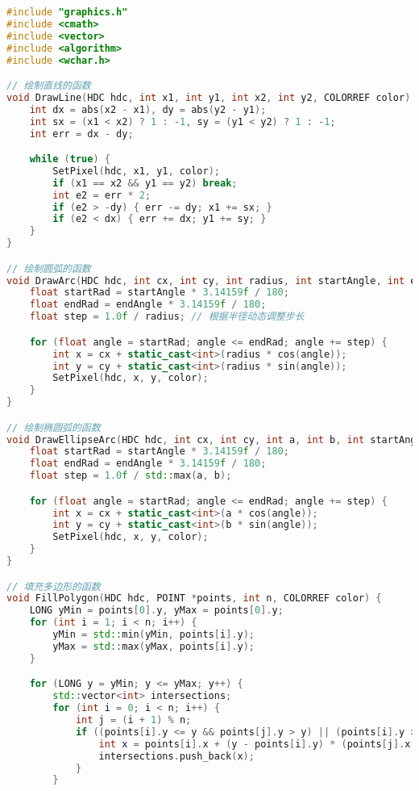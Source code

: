\documentclass[11pt,a4paper]{article}
\begin{document}
\begin{lstlisting}[language=C++]
#include "graphics.h"
#include <cmath>
#include <vector>
#include <algorithm>
#include <wchar.h>

// 绘制直线的函数
void DrawLine(HDC hdc, int x1, int y1, int x2, int y2, COLORREF color) {
    int dx = abs(x2 - x1), dy = abs(y2 - y1);
    int sx = (x1 < x2) ? 1 : -1, sy = (y1 < y2) ? 1 : -1;
    int err = dx - dy;

    while (true) {
        SetPixel(hdc, x1, y1, color);
        if (x1 == x2 && y1 == y2) break;
        int e2 = err * 2;
        if (e2 > -dy) { err -= dy; x1 += sx; }
        if (e2 < dx) { err += dx; y1 += sy; }
    }
}

// 绘制圆弧的函数
void DrawArc(HDC hdc, int cx, int cy, int radius, int startAngle, int endAngle, COLORREF color) {
    float startRad = startAngle * 3.14159f / 180;
    float endRad = endAngle * 3.14159f / 180;
    float step = 1.0f / radius; // 根据半径动态调整步长

    for (float angle = startRad; angle <= endRad; angle += step) {
        int x = cx + static_cast<int>(radius * cos(angle));
        int y = cy + static_cast<int>(radius * sin(angle));
        SetPixel(hdc, x, y, color);
    }
}

// 绘制椭圆弧的函数
void DrawEllipseArc(HDC hdc, int cx, int cy, int a, int b, int startAngle, int endAngle, COLORREF color) {
    float startRad = startAngle * 3.14159f / 180;
    float endRad = endAngle * 3.14159f / 180;
    float step = 1.0f / std::max(a, b);

    for (float angle = startRad; angle <= endRad; angle += step) {
        int x = cx + static_cast<int>(a * cos(angle));
        int y = cy + static_cast<int>(b * sin(angle));
        SetPixel(hdc, x, y, color);
    }
}

// 填充多边形的函数
void FillPolygon(HDC hdc, POINT *points, int n, COLORREF color) {
    LONG yMin = points[0].y, yMax = points[0].y;
    for (int i = 1; i < n; i++) {
        yMin = std::min(yMin, points[i].y);
        yMax = std::max(yMax, points[i].y);
    }

    for (LONG y = yMin; y <= yMax; y++) {
        std::vector<int> intersections;
        for (int i = 0; i < n; i++) {
            int j = (i + 1) % n;
            if ((points[i].y <= y && points[j].y > y) || (points[i].y > y && points[j].y <= y)) {
                int x = points[i].x + (y - points[i].y) * (points[j].x - points[i].x) / (points[j].y - points[i].y);
                intersections.push_back(x);
            }
        }


\end{lstlisting}
\end{document}
